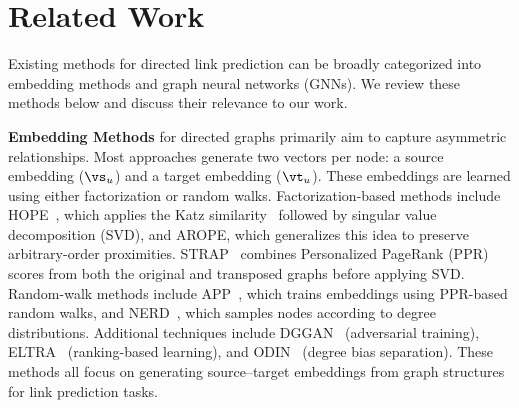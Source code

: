 \section{Related Work}
\label{app:related_work}
Existing methods for directed link prediction can be broadly categorized into embedding methods and graph neural networks (GNNs). We review these methods below and discuss their relevance to our work.

\textbf{Embedding Methods} for directed graphs primarily aim to capture asymmetric relationships. Most approaches generate two vectors per node: a source embedding ($\vs_u$) and a target embedding ($\vt_u$). These embeddings are learned using either factorization or random walks. Factorization-based methods include HOPE~\citep{hope}, which applies the Katz similarity~\cite{katz1953new} followed by singular value decomposition (SVD)\cite{golub2013matrix}, and AROPE\citep{arope}, which generalizes this idea to preserve arbitrary-order proximities. STRAP~\citep{strap} combines Personalized PageRank (PPR)~\citep{Page1999ThePC} scores from both the original and transposed graphs before applying SVD. Random-walk methods include APP~\citep{app}, which trains embeddings using PPR-based random walks, and NERD~\citep{nerd}, which samples nodes according to degree distributions. Additional techniques include DGGAN~\citep{dggan} (adversarial training), ELTRA~\citep{eltra} (ranking-based learning), and ODIN~\citep{odin} (degree bias separation). These methods all focus on generating source–target embeddings from graph structures for link prediction tasks.


